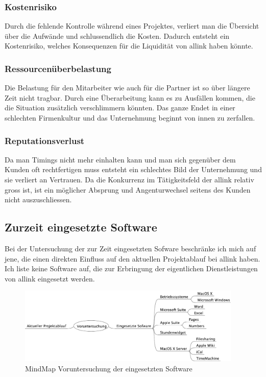 \subsubsection{Kostenrisiko}
Durch die fehlende Kontrolle während eines Projektes, verliert man die
Übersicht über die Aufwände und schlussendlich die Kosten. Dadurch entsteht
ein Kostenrisiko, welches Konsequenzen für die Liquidität von allink haben könnte.

\subsubsection{Ressourcenüberbelastung}
Die Belastung für den Mitarbeiter wie auch für die Partner ist so über
längere Zeit nicht tragbar. Durch eine Überarbeitung kann es zu Ausfällen kommen, die
die Situation zusätzlich verschlimmern könnten. Das ganze Endet in einer 
schlechten Firmenkultur und das Unternehmung beginnt von innen zu zerfallen.

\subsubsection{Reputationsverlust}
Da man Timings nicht mehr einhalten kann und man sich gegenüber dem Kunden
oft rechtfertigen muss entsteht ein schlechtes Bild der Unternehmung und sie
verliert an Vertrauen. Da die Konkurrenz im Tätigkeitsfeld der allink relativ
gross ist, ist ein möglicher Absprung und Angenturwechsel seitens des Kunden nicht 
auszuschliessen.

\subsection{Zurzeit eingesetzte Software}
Bei der Untersuchung der zur Zeit eingesetzten Sofware beschränke ich mich auf jene,
die einen direkten Einfluss auf den aktuellen Projektablauf bei allink haben.
Ich liste keine Software auf, die zur Erbringung der eigentlichen Dienstleistungen
von allink eingesetzt werden.

\begin{figure}[htbp]
\begin{center}
\includegraphics[width=0.95\textwidth,angle=0]{./mindmaps/voruntersuchung_software.pdf}
\caption{MindMap Voruntersuchung der eingesetzten Software}
\label{pic:voruntersuchung_software}
\end{center}
\end{figure}

